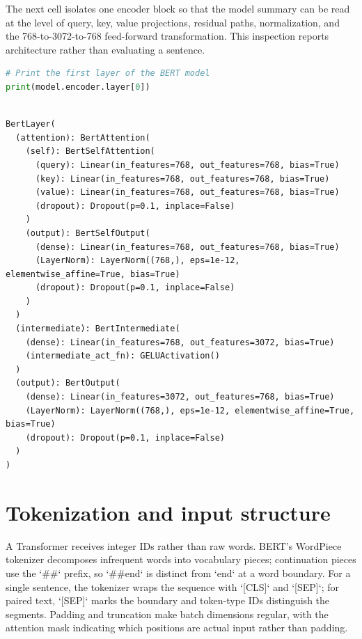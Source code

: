 \documentclass[../labs.tex]{subfiles}
\begin{document}
The next cell isolates one encoder block so that the model summary can be read at the level of query, key, value projections, residual paths, normalization, and the 768-to-3072-to-768 feed-forward transformation. This inspection reports architecture rather than evaluating a sentence.


\begin{lstlisting}[language=Python,basicstyle=\ttfamily\scriptsize,breaklines=true,breakatwhitespace=false,columns=fullflexible,keepspaces=true,numbers=none]
# Print the first layer of the BERT model
print(model.encoder.layer[0])
\end{lstlisting}

\hypertarget{out:lab03-bert-c02}{}\label{out:lab03-bert-c02}

\begin{lstlisting}[style=terminalOutput,breakatwhitespace=false,columns=fullflexible]

BertLayer(
  (attention): BertAttention(
    (self): BertSelfAttention(
      (query): Linear(in_features=768, out_features=768, bias=True)
      (key): Linear(in_features=768, out_features=768, bias=True)
      (value): Linear(in_features=768, out_features=768, bias=True)
      (dropout): Dropout(p=0.1, inplace=False)
    )
    (output): BertSelfOutput(
      (dense): Linear(in_features=768, out_features=768, bias=True)
      (LayerNorm): LayerNorm((768,), eps=1e-12, elementwise_affine=True, bias=True)
      (dropout): Dropout(p=0.1, inplace=False)
    )
  )
  (intermediate): BertIntermediate(
    (dense): Linear(in_features=768, out_features=3072, bias=True)
    (intermediate_act_fn): GELUActivation()
  )
  (output): BertOutput(
    (dense): Linear(in_features=3072, out_features=768, bias=True)
    (LayerNorm): LayerNorm((768,), eps=1e-12, elementwise_affine=True, bias=True)
    (dropout): Dropout(p=0.1, inplace=False)
  )
)

\end{lstlisting}

\section{Tokenization and input structure}

A Transformer receives integer IDs rather than raw words. BERT’s WordPiece tokenizer decomposes infrequent words into vocabulary pieces; continuation pieces use the `\#\#` prefix, so `\#\#end` is distinct from `end` at a word boundary. For a single sentence, the tokenizer wraps the sequence with `[CLS]` and `[SEP]`; for paired text, `[SEP]` marks the boundary and token-type IDs distinguish the segments. Padding and truncation make batch dimensions regular, with the attention mask indicating which positions are actual input rather than padding.
\end{document}
